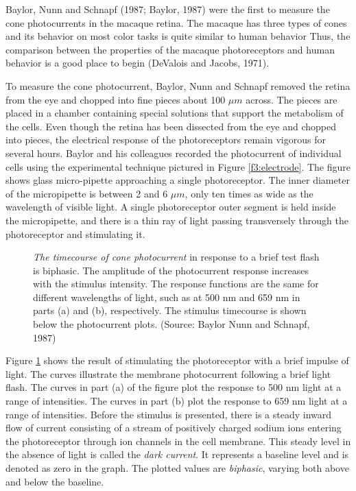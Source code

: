 Baylor, Nunn and Schnapf (1987; Baylor, 1987) were the first to
measure the cone photocurrents in the macaque retina.
The macaque has three types of cones and its behavior
on most color tasks is quite similar to human behavior
Thus, the comparison between the properties of the
macaque photoreceptors and human behavior is a good place to begin
(DeValois and Jacobs, 1971).

To measure the cone photocurrent, Baylor, Nunn and Schnapf
removed the retina from the eye and chopped into
fine pieces about 100 $\mu m$ across.
The pieces are
placed in a chamber containing special solutions
that support the metabolism of the cells.
Even though the retina has been dissected from
the eye and chopped into pieces,
the electrical response of the photoreceptors remain
vigorous for several hours.
Baylor and his colleagues recorded the photocurrent of individual cells
using the experimental technique pictured in Figure \ref{f3:electrode}.
The figure shows
glass micro-pipette approaching a single photoreceptor.
The inner diameter of the micropipette
is between 2 and 6 $\mu m$,
only ten times as wide as
the wavelength of visible light.
A single photoreceptor outer segment is held
inside the micropipette,
and there is a thin
ray of light passing transversely through the photoreceptor
and stimulating it.

\begin{figure}
\centerline{
}
\caption[Temporal Response of Photocurrent]{
{\em The timecourse of cone photocurrent} in response
to a brief test flash is biphasic.
The amplitude of the photocurrent response increases with
the stimulus intensity.
The response functions are
the same for different wavelengths of light,
such as at 500 nm and 659 nm in parts (a) and (b), respectively.
The stimulus timecourse is shown below the photocurrent plots.
(Source: Baylor Nunn and  Schnapf, 1987)  
}
\label{f3:cone.timecourse}
\end{figure}
Figure \ref{f3:cone.timecourse}
shows the result of stimulating the photoreceptor
with a brief impulse of light.
The curves illustrate
the membrane photocurrent following a brief light flash.
The curves in part (a) of the figure
plot the response to 500 nm light
at a range of intensities.
The curves in part (b)
plot the response to 659 nm light at a range of intensities.
Before the stimulus is presented, there is a steady
inward flow of current consisting
of a stream of
positively charged sodium ions entering the photoreceptor
through ion channels in the cell membrane.
This steady level in the absence of
light is called the {\em dark current}.
It represents a baseline level
and is denoted as zero in the graph.
The plotted values are {\em biphasic}, varying
both above and below the baseline.


